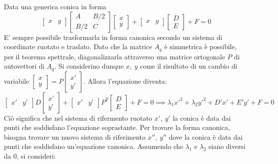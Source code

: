         \vspace{10pt}
        Data una generica conica in forma
        \[
            \begin{bmatrix} x & y\end{bmatrix} \begin{bmatrix} A & B/2 \\ B/2 & C \end{bmatrix} \begin{bmatrix} x \\ y \end{bmatrix} + \begin{bmatrix} x & y \end{bmatrix} \begin{bmatrix} D \\ E \end{bmatrix} + F = 0
        \]
        E' sempre possibile trasformarla in forma canonica secondo un sistema di coordinate ruotato e traslato. Dato che la matrice $A_q$ è simmetrica è possibile, per il teorema spettrale, diagonalizzarla attraverso una matrice ortogonale $P$ di autovettori di $A_q$. Si considerino dunque $x,\: y$ come il risultato di un cambio di variabile $\begin{bmatrix} x \\ y \end{bmatrix} = P \begin{bmatrix} x' \\ y' \end{bmatrix}$.
        Allora l'equazione diventa:
        \[
            \begin{bmatrix} x' & y' \end{bmatrix} D \begin{bmatrix} x' \\ y' \end{bmatrix} + \begin{bmatrix} x' & y' \end{bmatrix} P^{T} \begin{bmatrix} D \\ E \end{bmatrix} + F = 0 \implies \lambda_1 x'^2 + \lambda_2 y'^2 + D' x' + E' y' + F = 0
        \]
        Ciò significa che nel sistema di rifermento ruotato $x', \: y'$ la conica è data dai punti che soddisfano l'equazione soprastante. Per trovare la forma canonica, bisogna trovare un nuovo sistema di riferimento $x'', \: y''$ dove la conica è data dai punti che soddisfano un'equazione canonica.
        Assumendo che $\lambda_1$ e $\lambda_2$ siano diversi da 0, si consideri:

